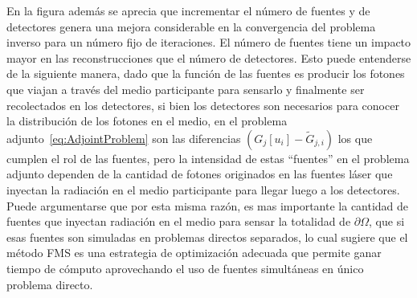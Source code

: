 En la figura además se aprecia que incrementar el número de fuentes y de detectores 
genera una mejora considerable en la convergencia del problema inverso 
para un número fijo de iteraciones. El número de fuentes tiene un impacto 
mayor en las reconstrucciones que el número de detectores. 
Esto puede entenderse de la siguiente manera, dado que la función de las fuentes 
es producir los fotones que viajan a través del medio participante para sensarlo 
y finalmente ser recolectados en los detectores, si bien los detectores son necesarios 
para conocer la distribución de los fotones en el medio, en el problema adjunto~\eqref{eq:AdjointProblem} 
son las diferencias $(G_j[u_i]-\widetilde{G}_{j,i})$ los que cumplen el rol de las fuentes, 
pero la intensidad de estas ``fuentes'' en el problema adjunto dependen de la cantidad 
de fotones originados en las fuentes láser que inyectan la radiación en el medio participante 
para llegar luego a los detectores. Puede argumentarse que por esta misma razón, 
es mas importante la cantidad de fuentes que inyectan radiación en el medio para sensar 
la totalidad de $\partial \Omega$, que si esas fuentes son simuladas en problemas 
directos separados, lo cual sugiere que el método FMS es una estrategia 
de optimización adecuada que permite ganar tiempo de cómputo aprovechando 
el uso de fuentes simultáneas en único problema directo.


